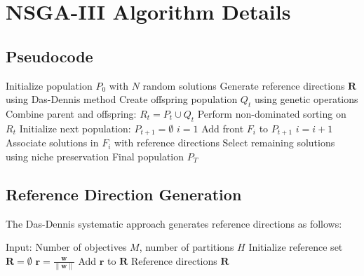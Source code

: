 \section{NSGA-III Algorithm Details}

\subsection{Pseudocode}

\begin{algorithm}[H]
\caption{NSGA-III for Nutrition Optimization}
\begin{algorithmic}[1]
\STATE Initialize population $P_0$ with $N$ random solutions
\STATE Generate reference directions $\mathbf{R}$ using Das-Dennis method
    \STATE Create offspring population $Q_t$ using genetic operations
    \STATE Combine parent and offspring: $R_t = P_t \cup Q_t$
    \STATE Perform non-dominated sorting on $R_t$
    \STATE Initialize next population: $P_{t+1} = \emptyset$
    \STATE $i = 1$
        \STATE Add front $F_i$ to $P_{t+1}$
        \STATE $i = i + 1$
    \ENDWHILE
        \STATE Associate solutions in $F_i$ with reference directions
        \STATE Select remaining solutions using niche preservation
    \ENDIF
\ENDFOR
\RETURN Final population $P_T$
\end{algorithmic}
\end{algorithm}

\subsection{Reference Direction Generation}

The Das-Dennis systematic approach generates reference directions as follows:

\begin{algorithm}[H]
\caption{Das-Dennis Reference Direction Generation}
\begin{algorithmic}[1]
\STATE Input: Number of objectives $M$, number of partitions $H$
\STATE Initialize reference set $\mathbf{R} = \emptyset$
        \STATE $\mathbf{r} = \frac{\mathbf{w}}{\|\mathbf{w}\|}$
        \STATE Add $\mathbf{r}$ to $\mathbf{R}$
    \ENDIF
\ENDFOR
\RETURN Reference directions $\mathbf{R}$
\end{algorithmic}
\end{algorithm}

